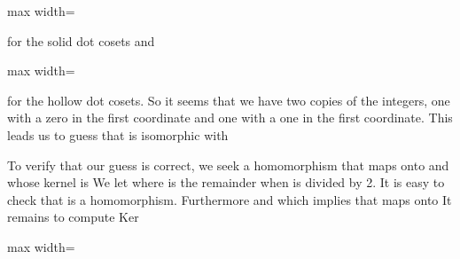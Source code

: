 \documentclass[11pt,oneside]{article}
\begin{document}
\begin{BookBody}

\begin{center}\begin{adjustbox}{max width=\linewidth}\end{adjustbox}\end{center}

\noindent for the solid dot cosets and

\begin{center}\begin{adjustbox}{max width=\linewidth}\end{adjustbox}\end{center}

\noindent for the hollow dot cosets. So it seems that we have two copies of the integers, one with a zero in the first coordinate and one with a one in the first coordinate. This leads us to guess that  is isomorphic with 

To verify that our guess is correct, we seek a homomorphism  that maps onto  and whose kernel is  We let  where  is the remainder when  is divided by 2. It is easy to check that \BookInline{\phi } is a homomorphism. Furthermore and  which implies that \BookInline{\phi } maps onto  It remains to compute Ker

\begin{center}\begin{adjustbox}{max width=\linewidth}\end{adjustbox}\end{center}


\end{BookBody}
\end{document}
